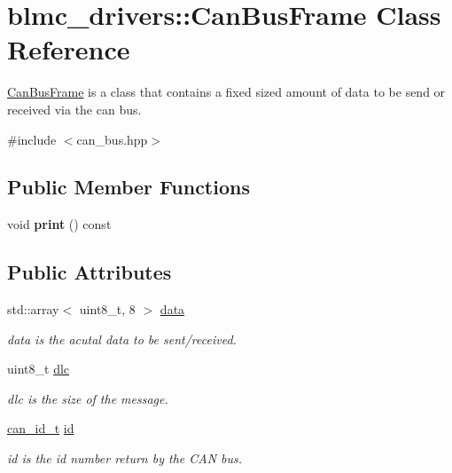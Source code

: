 \hypertarget{classblmc__drivers_1_1CanBusFrame}{}\section{blmc\+\_\+drivers\+:\+:Can\+Bus\+Frame Class Reference}
\label{classblmc__drivers_1_1CanBusFrame}


\hyperlink{classblmc__drivers_1_1CanBusFrame}{Can\+Bus\+Frame} is a class that contains a fixed sized amount of data to be send or received via the can bus.  




{\ttfamily \#include $<$can\+\_\+bus.\+hpp$>$}

\subsection*{Public Member Functions}
\begin{DoxyCompactItemize}
\item 
\mbox{\label{classblmc__drivers_1_1CanBusFrame_a10d2fee2bce365dd585ae9ec813b484c}} 
void {\bfseries print} () const
\end{DoxyCompactItemize}
\subsection*{Public Attributes}
\begin{DoxyCompactItemize}
\item 
\mbox{\label{classblmc__drivers_1_1CanBusFrame_a1a4cd54d31de4361b003e39dfdfa4cfe}} 
std\+::array$<$ uint8\+\_\+t, 8 $>$ \hyperlink{classblmc__drivers_1_1CanBusFrame_a1a4cd54d31de4361b003e39dfdfa4cfe}{data}
\begin{DoxyCompactList}\small\item\em data is the acutal data to be sent/received. \end{DoxyCompactList}\item 
\mbox{\label{classblmc__drivers_1_1CanBusFrame_ab5c88f0e6fa037ace23a059a3e75b30b}} 
uint8\+\_\+t \hyperlink{classblmc__drivers_1_1CanBusFrame_ab5c88f0e6fa037ace23a059a3e75b30b}{dlc}
\begin{DoxyCompactList}\small\item\em dlc is the size of the message. \end{DoxyCompactList}\item 
\mbox{\label{classblmc__drivers_1_1CanBusFrame_a5d204dce9fded6502c7d51f3aabbad61}} 
\hyperlink{os__interface_8hpp_ab9491ad99890aa9ecf1785d1edd23d64}{can\+\_\+id\+\_\+t} \hyperlink{classblmc__drivers_1_1CanBusFrame_a5d204dce9fded6502c7d51f3aabbad61}{id}
\begin{DoxyCompactList}\small\item\em id is the id number return by the C\+AN bus. \end{DoxyCompactList}\end{DoxyCompactItemize}


